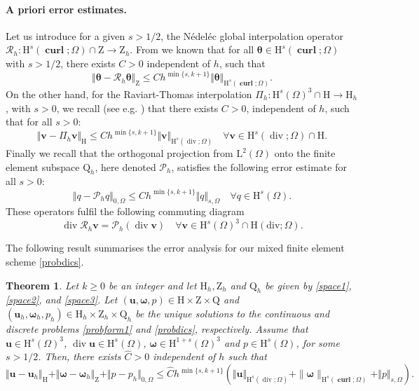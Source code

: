 \documentclass[reqno,a4paper]{article}
\numberwithin{equation}{section}
\newcommand\bu{\boldsymbol{u}}
\newcommand\bv{\boldsymbol{v}}
\renewcommand\O{\Omega}
\renewcommand\H{\mathrm{H}}
\renewcommand\L{\mathrm{L}}
\newcommand\Q{\mathrm{Q}}
\newcommand\Z{\mathrm{Z}}
\newcommand\LO{\L^2(\O)}
\newcommand\vdiv{\mathop{\mathrm{div}}\nolimits}
\newcommand\hdivO{{\H(\mathrm{div};\O)}}
\newcommand\HsO{\H^s(\O)}
\newcommand\HusO{\H^{1+s}(\O)}
\newcommand\bomega{\boldsymbol{\omega}}
\newcommand\btheta{\boldsymbol{\theta}}
\newtheorem{theorem}{Theorem}[section]
\newcommand\curl{\mathop{\mathbf{curl}}\nolimits}
\def\CR{{\mathcal R}}
\def\CP{{\mathcal P}}
\begin{document}
\paragraph{A priori error estimates.}
Let us 
introduce for a given $s>1/2$, the N\'edel\'ec global interpolation operator
$\CR_{h}:\H^s(\curl;\O)\cap\Z\to\Z_h$. From \cite{Alo-Valli} we known that 
%
for all $\btheta\in\H^{s}(\curl;\O)$ with $s>1/2$, 
there exists $C>0$ independent of $h$, such that
\begin{equation}\label{prop2N}
\Vert \btheta-\CR_{h}\btheta\Vert_{\Z}\le
Ch^{\min\{s,k+1\}}\Vert\btheta\Vert_{\H^{s}(\curl;\O)}.
\end{equation}
%
On the other hand, for the Raviart-Thomas interpolation 
$\Pi_h:\HsO^{3}\cap\H\to\H_h$, with $s>0$, we recall (see e.g. \cite{G2014}) that 
there exists $C>0$, independent of $h$, such that for all $s>0$:
\begin{equation}\label{prop2rt}
\Vert \bv-\Pi_h\bv\Vert_{\H}\le
Ch^{\min\{s,k+1\}}\Vert\bv\Vert_{\H^s(\vdiv;\O)}\quad\forall \bv\in\H^s(\vdiv;\O)\cap\H.
\end{equation}
Finally we recall that the orthogonal projection from $\LO$ onto the finite element subspace $\Q_h$, 
here denoted $\CP_h$, satisfies the following error estimate for all $s>0$:
\begin{equation}\label{cotar}
\Vert q-\CP_h q\Vert_{0,\O}\le Ch^{\min\{s,k+1\}}\Vert q\Vert_{s,\O}\quad\forall q\in\HsO.
\end{equation}
These operators fulfil the following commuting diagram 
\begin{equation*}
\vdiv\CR_h\bv=\CP_h(\vdiv\bv)\quad\forall \bv\in\HsO^{3}\cap\hdivO.
\end{equation*}

The following result summarises the error analysis for our mixed
finite element scheme \eqref{probdics}.
\begin{theorem}\label{theo:conv}
Let $k\ge 0$ be an integer and let $\H_h,\Z_h$ and $\Q_h$
be given by \eqref{space1}, \eqref{space2}, and \eqref{space3}.
Let $(\bu,\bomega,p)\in\H\times\Z\times\Q$ and
$(\bu_h,\bomega_h,p_h)\in\H_h\times\Z_h\times\Q_h$ be the unique solutions
to the continuous and discrete problems \eqref{probform1} and
\eqref{probdics}, respectively.  Assume that
$\bu\in\HsO^3$, $\vdiv\bu\in\HsO$, $\bomega\in\HusO^3$ and $p\in\HsO$, for some
$s>1/2$. Then, there exists $\hat{C}>0$ independent of $h$ such
  that
$${\Vert\bu-\bu_h\Vert_{\H}+\Vert\bomega-\bomega_h\Vert_{\Z}+\Vert
  p-p_h\Vert_{0,\O} \leq\hat{C}h^{\min\{s,k+1\}}(\Vert\bu\Vert_{\H^s(\vdiv;\O)}+\|\bomega\|_{\H^s(\curl;\O)}+\Vert p\Vert_{s,\O}).}$$
\end{theorem}
\end{document}
